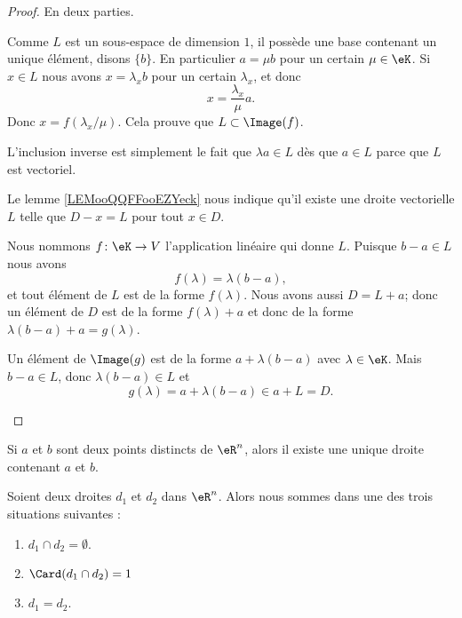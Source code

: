 \begin{proof}
	En deux parties.
	\begin{subproof}
		Comme \( L\) est un sous-espace de dimension \( 1\), il possède une base contenant un unique élément, disons \( \{ b \}\). En particulier \( a=\mu b\) pour un certain \( \mu\in \eK\). Si \( x\in L\) nous avons \( x=\lambda_x b\) pour un certain \( \lambda_x\), et donc
		\begin{equation}
			x=\frac{ \lambda_x }{ \mu }a.
		\end{equation}
		Donc \( x=f(\lambda_x/\mu)\). Cela prouve que \( L\subset\Image(f)\).

		L'inclusion inverse est simplement le fait que \( \lambda a\in L\) dès que \( a\in L\) parce que \( L\) est vectoriel.

		Le lemme \ref{LEMooQQFFooEZYeck} nous indique qu'il existe une droite vectorielle \( L\) telle que \( D-x=L\) pour tout \( x\in D\).
		\begin{subproof}
			Nous nommons \( f\colon \eK\to V\) l'application linéaire qui donne \( L\). Puisque \( b-a\in L\) nous avons
			\begin{equation}
				f(\lambda)=\lambda(b-a),
			\end{equation}
			et tout élément de \( L\) est de la forme \( f(\lambda)\). Nous avons aussi \( D=L+a\); donc un élément de \( D\) est de la forme \( f(\lambda)+a\) et donc de la forme \( \lambda(b-a)+a=g(\lambda)\).

			Un élément de \( \Image(g)\) est de la forme \( a+\lambda(b-a)\) avec \( \lambda\in \eK\). Mais \( b-a\in L\), donc \( \lambda(b-a)\in L\) et
			\begin{equation}
				g(\lambda)=a+\lambda(b-a)\in a+L=D.
			\end{equation}
		\end{subproof}
	\end{subproof}
\end{proof}

\begin{proposition}     \label{PROPooRSKLooVrxrFz}
	Si \( a\) et \( b\) sont deux points distincts de \( \eR^n\), alors il existe une unique droite contenant \( a\) et \( b\).
\end{proposition}

\begin{proposition}     \label{PROPooTFTJooJejuBU}
	Soient deux droites \( d_1\) et \( d_2\) dans \( \eR^n\). Alors nous sommes dans une des trois situations suivantes :
	\begin{enumerate}
		\item
		      \( d_1\cap d_2=\emptyset\).
		\item
		      \( \Card(d_1\cap d_2)=1\)
		\item
		      \( d_1=d_2\).
	\end{enumerate}
\end{proposition}

